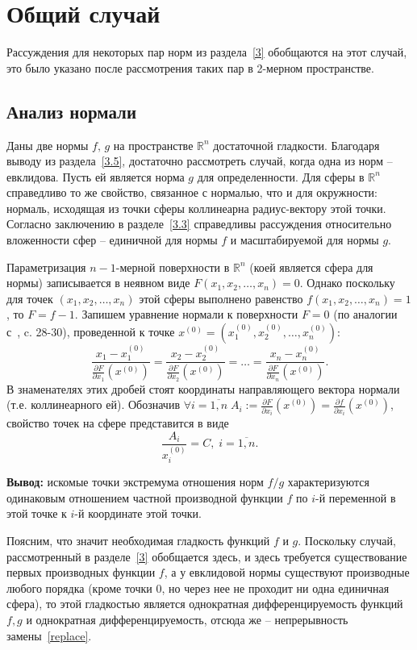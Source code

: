 \documentclass{article}
\begin{document}
\newpage
\section{Общий случай}
Рассуждения для некоторых пар норм из раздела~\ref{3} обобщаются на этот случай, это было указано после рассмотрения таких пар в 2-мерном пространстве.
\subsection{Анализ нормали}
Даны две нормы $f, \, g$ на пространстве $\mathbb{R}^n$ достаточной гладкости. Благодаря выводу из раздела~\ref{3.5}, достаточно рассмотреть случай, когда одна из норм -- евклидова. Пусть ей является норма $g$ для определенности. Для сферы в $\mathbb{R}^n$ справедливо то же свойство, связанное с нормалью, что и для окружности: нормаль, исходящая из точки сферы коллинеарна радиус-вектору этой точки. Согласно заключению в разделе~\ref{3.3} справедливы рассуждения относительно вложенности сфер -- единичной для нормы $f$ и масштабируемой для нормы $g$.

Параметризация $n-1$-мерной поверхности в $\mathbb{R}^n$ (коей является сфера для нормы) записывается в неявном виде $F(x_1,x_2,\ldots,x_n) = 0$. Однако поскольку для точек $(x_1,x_2,\ldots,x_n)$ этой сферы выполнено равенство $f(x_1,x_2,\ldots,x_n) = 1$, то $F = f - 1$.
Запишем уравнение нормали к поверхности $F = 0$ (по аналогии с~\cite{Ignatyev}, c. 28-30), проведенной к точке $x^{(0)} = \left(x_1^{(0)},x_2^{(0)},\ldots,x_n^{(0)}\right)$:
$$ \frac{x_1-x_1^{(0)}}{\frac{\partial F}{\partial x_1}\left(x^{(0)}\right)} = \frac{x_2-x_2^{(0)}}{\frac{\partial F}{\partial x_2}\left(x^{(0)}\right)} = \ldots = \frac{x_n-x_n^{(0)}}{\frac{\partial F}{\partial x_n}\left(x^{(0)}\right)}. $$
В знаменателях этих дробей стоят координаты направляющего вектора нормали (т.е. коллинеарного ей). Обозначив $\forall{i = \overline{1,n}} \; A_i := \frac{\partial F}{\partial x_i}\left(x^{(0)}\right) = \frac{\partial f}{\partial x_i}\left(x^{(0)}\right)$, свойство точек на сфере представится в виде
$$ \frac{A_i}{x_i^{(0)}} = C, \; i = \overline{1,n}. $$

\textbf{Вывод:} искомые точки экстремума отношения норм $f/g$ характеризуются одинаковым отношением частной производной функции $f$ по $i$-й переменной в этой точке к $i$-й координате этой точки.

Поясним, что значит необходимая гладкость функций $f$ и $g$. Поскольку случай, рассмотренный в разделе~\ref{3} обобщается здесь, и здесь требуется существование первых производных функции $f$, а у евклидовой нормы существуют производные любого порядка (кроме точки 0, но через нее не проходит ни одна единичная сфера), то этой гладкостью является однократная дифференцируемость функций $f,g$ и однократная дифференцируемость, отсюда же -- непрерывность замены~\eqref{replace}.
\end{document}
